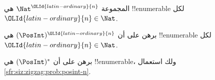 \documentclass[../../../include/open-logic-section]{subfiles}
\begin{document}
\begin{prop}
المجموعة $\Nat^{\OLId{latin-ordinary}{n}}$ هي !!{enumerable} لكل ${\OLId{latin-ordinary}{n}} \in \Nat$.
\end{prop}

\begin{prob}\label{sfr:siz:zigzag:prob:posint-n}
برهن على أن $(\PosInt)^{\OLId{latin-ordinary}{n}}$ هي !!{enumerable} لكل ${\OLId{latin-ordinary}{n}} \in \Nat$.
\end{prob}

\begin{prob}\label{sfr:siz:zigzag:prob:posint-star}
  برهن على أن $(\PosInt)^*$ هي !!{enumerable}، ولك استعمال \cref{sfr:siz:zigzag:prob:posint-n}.
\end{prob}
\end{document}
